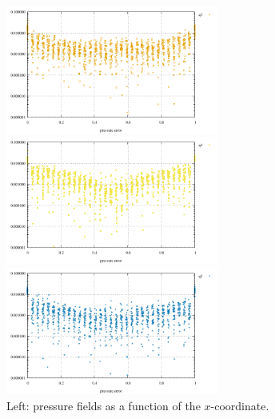 \begin{center}
\includegraphics[width=7cm]{python_codes/fieldstone_12/results/rand/q3_error}\\
\includegraphics[width=7cm]{python_codes/fieldstone_12/results/rand/q4_error}
\includegraphics[width=7cm]{python_codes/fieldstone_12/results/rand/q5_error}\\
{\captionfont Left: pressure fields as a function of the $x$-coordinate.} 
\end{center}

